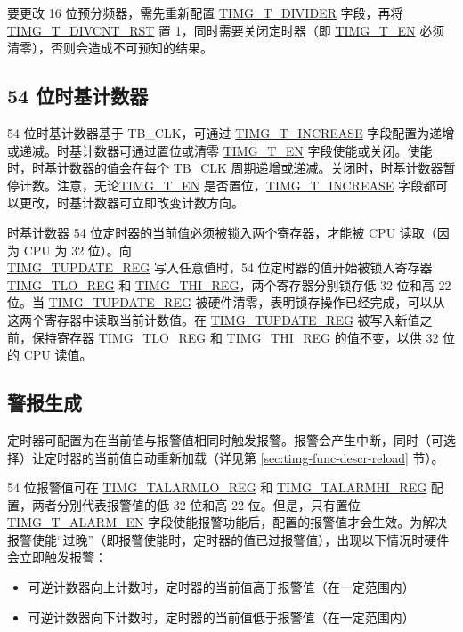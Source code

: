 \documentclass[main\_\_CN.tex]{subfiles}
\begin{document}
要更改 16 位预分频器，需先重新配置 \hyperref[fielddesc:TIMGTXDIVIDER]{TIMG\_T\_DIVIDER} 字段，再将 \hyperref[fielddesc:TIMGTXDIVCNTRST]{TIMG\_T\_DIVCNT\_RST} 置 1，同时需要关闭定时器（即 \hyperref[fielddesc:TIMGTXEN]{TIMG\_T\_EN} 必须清零），否则会造成不可预知的结果。

\subsection{54 位时基计数器}
54 位时基计数器基于 TB\_CLK，可通过 \hyperref[fielddesc:TIMGTXINCREASE]{TIMG\_T\_INCREASE} 字段配置为递增或递减。时基计数器可通过置位或清零 \hyperref[fielddesc:TIMGTXEN]{TIMG\_T\_EN} 字段使能或关闭。使能时，时基计数器的值会在每个 TB\_CLK 周期递增或递减。关闭时，时基计数器暂停计数。注意，无论\hyperref[fielddesc:TIMGTXEN]{TIMG\_T\_EN} 是否置位，\hyperref[fielddesc:TIMGTXINCREASE]{TIMG\_T\_INCREASE} 字段都可以更改，时基计数器可立即改变计数方向。

时基计数器 54 位定时器的当前值必须被锁入两个寄存器，才能被 CPU 读取（因为 CPU 为 32 位）。向 \\\hyperref[regdesc:TIMGTXUPDATEREG]{TIMG\_TUPDATE\_REG} 写入任意值时，54 位定时器的值开始被锁入寄存器 \hyperref[regdesc:TIMGTXLOREG]{TIMG\_TLO\_REG} 和 \hyperref[regdesc:TIMGTXHIREG]{TIMG\_THI\_REG}，两个寄存器分别锁存低 32 位和高 22 位。当 \hyperref[regdesc:TIMGTXUPDATEREG]{TIMG\_TUPDATE\_REG} 被硬件清零，表明锁存操作已经完成，可以从这两个寄存器中读取当前计数值。在 \hyperref[regdesc:TIMGTXUPDATEREG]{TIMG\_TUPDATE\_REG} 被写入新值之前，保持寄存器 \hyperref[regdesc:TIMGTXLOREG]{TIMG\_TLO\_REG} 和 \hyperref[regdesc:TIMGTXHIREG]{TIMG\_THI\_REG} 的值不变，以供 32 位的 CPU 读值。

\subsection{警报生成}
定时器可配置为在当前值与报警值相同时触发报警。报警会产生中断，同时（可选择）让定时器的当前值自动重新加载（详见第 \ref{sec:timg-func-descr-reload} 节）。

54 位报警值可在 \hyperref[regdesc:TIMGTXALARMLOREG]{TIMG\_TALARMLO\_REG} 和 \hyperref[regdesc:TIMGTXALARMHIREG]{TIMG\_TALARMHI\_REG} 配置，两者分别代表报警值的低 32 位和高 22 位。但是，只有置位 \hyperref[fielddesc:TIMGTXALARMEN]{TIMG\_T\_ALARM\_EN} 字段使能报警功能后，配置的报警值才会生效。为解决报警使能“过晚”（即报警使能时，定时器的值已过报警值），出现以下情况时硬件会立即触发报警：
\begin{itemize}
    \item 可逆计数器向上计数时，定时器的当前值高于报警值（在一定范围内）
    \item 可逆计数器向下计数时，定时器的当前值低于报警值（在一定范围内）
\end{itemize}
\end{document}
